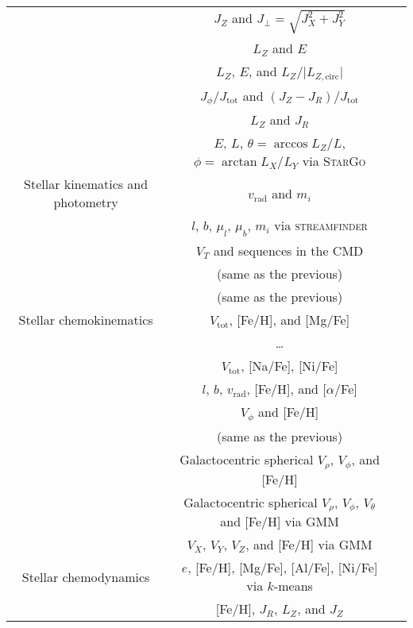 \begin{table*}
\begin{tabular}{c|c|c}
        & $J_Z$ and $J_\perp = \sqrt{J_X^2 + J_Y^2}$ & \citet{Helmi1999} \\
        & $L_Z$ and $E$ & \citet{Helmi2017, Helmi2018} \\
        & $L_Z$, $E$, and $L_Z/\vert L_{Z,\text{circ}} \vert$ & \citet{Koppelman2019} \\
        & $J_\phi / J_\text{tot}$ and $(J_Z - J_R) / J_\text{tot}$ & \citet{Myeong2019} \\
        & $L_Z$ and $J_R$ & \citet{Feuillet2020} \\
        & $E$, $L$, $\theta = \arccos{L_Z/L}$, $\phi = \arctan{L_X/L_Y}$ via \textsc{StarGo} & \citet{Yuan2020} \\
        \hline
        Stellar kinematics and photometry & $v_\text{rad}$ and $m_i$ & \citet{Ibata1994} \\
        & $l$, $b$, $\mu_l$, $\mu_b$, $m_i$ via \textsc{streamfinder} & \citet{Malhan2018} \\
        & $V_T$ and sequences in the CMD & \citet{Babusiaux2018} \\
        & (same as the previous) & \citet{Haywood2018b} \\
        & (same as the previous) & \citet{Gallart2019} \\
        \hline
        Stellar chemokinematics & $V_\text{tot}$, [Fe/H], and [Mg/Fe] & \citet{Nissen2010} \\
        & \dots & \citet{Navarro2011} \\
        & $V_\text{tot}$, [Na/Fe], [Ni/Fe] & \citet{Bensby2014} \\
        & $l$, $b$, $v_\text{rad}$, [Fe/H], and [$\alpha$/Fe] & \citet{Hawkins2015} \\
        & $V_\phi$ and [Fe/H] & \citet{Belokurov2020} \\
        & (same as the previous) & \citet{An2021b} \\
        & Galactocentric spherical $V_\rho$, $V_\phi$, and [Fe/H] & \citet{Belokurov2018} \\
        & Galactocentric spherical $V_\rho$, $V_\phi$, $V_\theta$ and [Fe/H] via GMM & \citet{Myeong2018c} \\
        & $V_X$, $V_Y$, $V_Z$, and [Fe/H] via GMM & \citet{Nikakhtar2021} \\
        \hline
        Stellar chemodynamics & $e$, [Fe/H], [Mg/Fe], [Al/Fe], [Ni/Fe] via $k$-means & \citet{Mackereth2019} \\
        & [Fe/H], $J_R$, $L_Z$, and $J_Z$ & \citet{Myeong2018b} \\

\end{tabular}
\end{table*}
